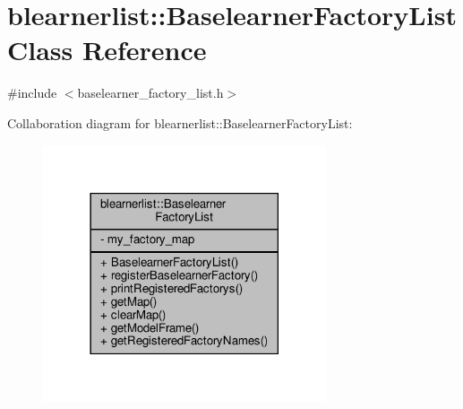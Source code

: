 \hypertarget{classblearnerlist_1_1_baselearner_factory_list}{}\section{blearnerlist\+:\+:Baselearner\+Factory\+List Class Reference}
\label{classblearnerlist_1_1_baselearner_factory_list}


{\ttfamily \#include $<$baselearner\+\_\+factory\+\_\+list.\+h$>$}



Collaboration diagram for blearnerlist\+:\+:Baselearner\+Factory\+List\+:\nopagebreak
\begin{figure}[H]
\begin{center}
\leavevmode
\includegraphics[width=237pt]{classblearnerlist_1_1_baselearner_factory_list__coll__graph}
\end{center}
\end{figure}
